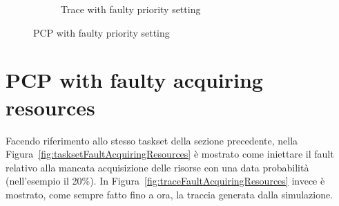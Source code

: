 \begin{figure}[htbp]
\begin{subfigure}{0.45\textwidth}
{        }
        \caption{Trace with faulty priority setting}
        \label{fig:traceFaultSetPriority}
        \vfill
    \end{subfigure}
    \caption{PCP with faulty priority setting}
\end{figure}

\section{PCP with faulty acquiring resources}
Facendo riferimento allo stesso taskset della sezione precedente, nella Figura~\ref{fig:tasksetFaultAcquiringResources} è mostrato come iniettare il fault relativo alla mancata acquisizione delle risorse con una data probabilità (nell'esempio il 20\%). In Figura~\ref{fig:traceFaultAcquiringResources} invece è mostrato, come sempre fatto fino a ora, la traccia generata dalla simulazione.


